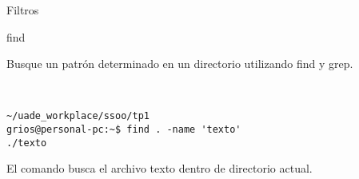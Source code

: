 \begin{section}{Filtros}
\begin{subsection}{find}
\begin{quoting}
Busque un patrón determinado en un directorio utilizando find y grep.
\end{quoting}\\

\begin{lstlisting}[style=Ubuntu]
~/uade_workplace/ssoo/tp1
grios@personal-pc:~$ find . -name 'texto'
./texto

\end{lstlisting}
El comando busca el archivo texto dentro de directorio actual.

\end{subsection}

\end{section}